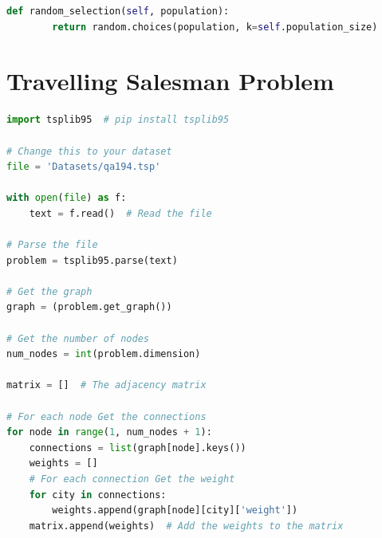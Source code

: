 \documentclass[12pt]{report} %
\begin{document}
\vspace{1cm}

\begin{changemargin}{-3cm}{-2cm}

	\begin{lstlisting}[language=python, caption= {Random selection}, captionpos=b]
    def random_selection(self, population):
        return random.choices(population, k=self.population_size)

\end{lstlisting}
\end{changemargin}

\newpage

\section{Travelling Salesman Problem}

\begin{changemargin}{-3cm}{-2cm}

	\begin{lstlisting}[language=python, caption= {Storing the dataset in a adjacency matrix}, captionpos=b]
import tsplib95  # pip install tsplib95

# Change this to your dataset
file = 'Datasets/qa194.tsp'

with open(file) as f:
    text = f.read()  # Read the file

# Parse the file
problem = tsplib95.parse(text)

# Get the graph
graph = (problem.get_graph())

# Get the number of nodes
num_nodes = int(problem.dimension)

matrix = []  # The adjacency matrix

# For each node Get the connections
for node in range(1, num_nodes + 1):
    connections = list(graph[node].keys())
    weights = []
    # For each connection Get the weight
    for city in connections:
        weights.append(graph[node][city]['weight'])
    matrix.append(weights)  # Add the weights to the matrix
\end{lstlisting}
\end{changemargin}


\newpage
\end{document}
